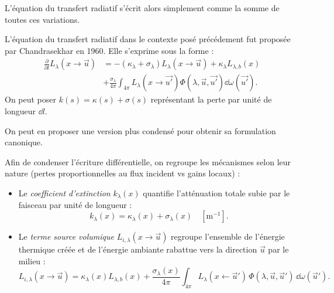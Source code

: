 L'équation du transfert radiatif s'écrit alors simplement comme la somme de toutes ces variations. 

\begin{theorem}
    L'équation du transfert radiatif dans le contexte posé précédement fut proposée par Chandrasekhar en 1960. Elle s'exprime sous la forme : 
    \begin{align}
        \frac{ \partial}{ \partial l} L_\lambda(x \to \vec{u} ) &= - ( \kappa_\lambda + \sigma_\lambda) L_\lambda(x \to \vec{u} ) + \kappa_\lambda L_{\lambda, b}(x) \\
        &+ \frac{ \sigma_\lambda}{4 \pi} \int_{4 \pi} L_\lambda (x \to \vec{u'} ) \Phi ( \lambda, \vec{u} , \vec{u'} ) \dd \omega( \vec{u'} ). 
    \end{align}
    On peut poser $k(s) = \kappa(s) + \sigma(s)$ représentant la perte par unité de longueur $ \dd l$. 
\end{theorem}

On peut en proposer une version plus condensé pour obtenir sa formulation canonique. 

\begin{definition}
    Afin de condenser l'écriture différentielle, on regroupe les mécanismes selon leur nature (pertes proportionnelles au flux incident vs gains locaux) :
    \begin{itemize}
        \item Le \emph{coefficient d'extinction} $k_\lambda(x)$ quantifie l'atténuation totale subie par le faisceau par unité de longueur :
        \begin{equation}
            k_\lambda(x) = \kappa_\lambda(x) + \sigma_\lambda(x) \quad [\mathrm{m}^{-1}].
        \end{equation}
        \item Le \emph{terme source volumique} $L_{i, \lambda}(x \to \vec{u})$ regroupe l'ensemble de l'énergie thermique créée et de l'énergie ambiante rabattue vers la direction $\vec{u}$ par le milieu :
        \begin{equation}
            L_{i, \lambda}(x \to \vec{u}) = \kappa_\lambda(x) L_{\lambda, b}(x) + \frac{\sigma_\lambda(x)}{4 \pi} \int_{4 \pi} L_\lambda(x \leftarrow \vec{u}') \, \Phi(\lambda, \vec{u}, \vec{u}') \, \dd \omega(\vec{u}').
        \end{equation}
    \end{itemize}
\end{definition}

